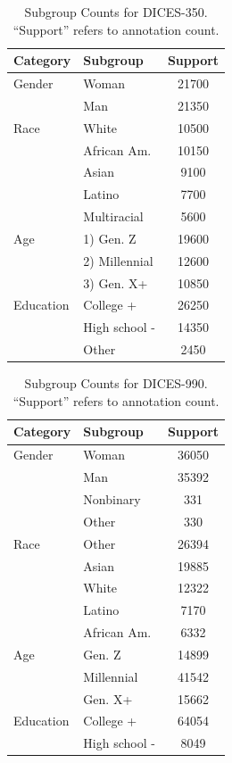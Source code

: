 \documentclass{article} %
\theoremstyle{definition}
\theoremstyle{plain}
\begin{document}
\begin{table}[ht]
	\centering
	\begin{tabular}{llc}
		\toprule
		\textbf{Category} & \textbf{Subgroup}  & \textbf{Support}\\
		\midrule
		Gender & Woman & 21700 \\
		& Man & 21350 \\
		\midrule
		Race & White & 10500 \\
		& African Am. & 10150 \\
		& Asian & 9100 \\
		& Latino & 7700 \\
		& Multiracial & 5600 \\
		\midrule
		Age & 1) Gen. Z & 19600 \\
		& 2) Millennial & 12600 \\
		& 3) Gen. X+ & 10850 \\
		\midrule
		Education & College + & 26250 \\
		& High school - & 14350 \\
		& Other & 2450 \\
		\bottomrule
	\end{tabular}
	\caption{Subgroup Counts for DICES-350. ``Support'' refers to annotation count.}
	\label{tab:dices350-stats}
\end{table}

\begin{table}[ht]
	\centering
	\begin{tabular}{llc}
		\toprule
		\textbf{Category} & \textbf{Subgroup} & \textbf{Support} \\
		\midrule
		Gender & Woman & 36050 \\
		& Man & 35392 \\
		& Nonbinary & 331 \\
		& Other & 330 \\
		\midrule
		Race & Other & 26394 \\
		& Asian & 19885 \\
		& White & 12322 \\
		& Latino & 7170 \\
		& African Am. & 6332 \\
		\midrule
		Age & Gen. Z & 14899 \\
		& Millennial & 41542 \\
		& Gen. X+ & 15662 \\
		\midrule
		Education & College + & 64054 \\
		& High school - & 8049 \\
		\bottomrule
	\end{tabular}
		\caption{Subgroup Counts for DICES-990. ``Support'' refers to annotation count.}
	\label{tab:dices990-stats}
\end{table}
\end{document}
